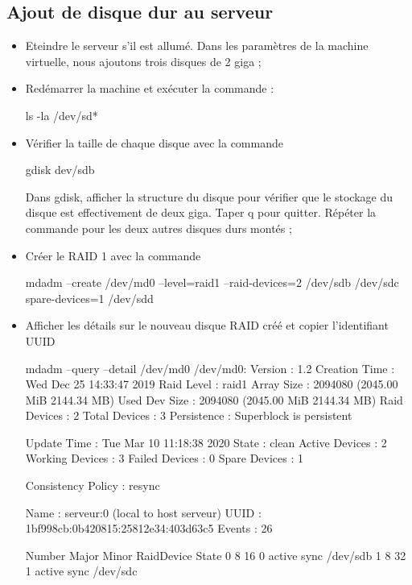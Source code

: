 \documentclass[a4paper,12pt,french]{report} %
\begin{document}
\subsection{Ajout de disque dur au serveur}	
\begin{itemize}
	\item Eteindre le serveur s'il est allumé. Dans les paramètres de la machine virtuelle, nous ajoutons trois disques de 2 giga ;
	\item Redémarrer la machine et exécuter la commande :
	\begin{exempleConsole}
		ls -la /dev/sd* 
	\end{exempleConsole}
	\item Vérifier la taille de chaque disque avec la commande
	\begin{exempleConsole}
	gdisk dev/sdb
	\end{exempleConsole}
	Dans gdisk, afficher la structure du disque pour vérifier que le stockage du disque est effectivement de deux giga. Taper q  pour quitter. Répéter la commande pour  les deux autres disques durs montés ;
 	\item Créer le RAID 1 avec la commande  
	\begin{exempleConsole}
	mdadm --create /dev/md0 --level=raid1 --raid-devices=2 /dev/sdb /dev/sdc spare-devices=1 /dev/sdd
	\end{exempleConsole}
	\item Afficher les détails sur le nouveau disque RAID créé et copier l'identifiant UUID
	\begin{exempleConsole}
		mdadm --query --detail /dev/md0
		/dev/md0:
				   Version : 1.2
			 Creation Time : Wed Dec 25 14:33:47 2019
				Raid Level : raid1
				Array Size : 2094080 (2045.00 MiB 2144.34 MB)
			 Used Dev Size : 2094080 (2045.00 MiB 2144.34 MB)
			  Raid Devices : 2
			 Total Devices : 3
			   Persistence : Superblock is persistent
		
			   Update Time : Tue Mar 10 11:18:38 2020
					 State : clean
			Active Devices : 2
		   Working Devices : 3
			Failed Devices : 0
			 Spare Devices : 1
		
		Consistency Policy : resync
		
					  Name : serveur:0  (local to host serveur)
					  UUID : 1bf998cb:0b420815:25812e34:403d63c5
					Events : 26
		
			Number   Major   Minor   RaidDevice State
			   0       8       16        0      active sync   /dev/sdb
			   1       8       32        1      active sync   /dev/sdc
		

\end{exempleConsole}
\end{itemize}
\end{document}
